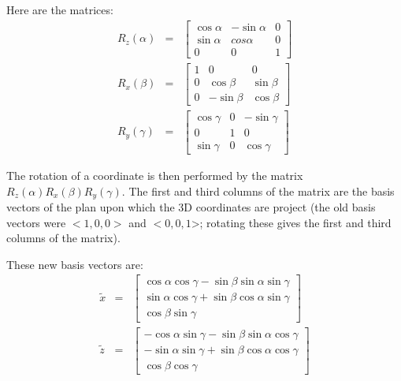 \documentclass[11pt,english,BCOR10mm,DIV12,bibliography=totoc,parskip=false,smallheadings
    headexclude,footexclude,oneside,dvipsnames,svgnames]{pst-doc}
\def\la{<}
\def\ra{>}
\begin{document}
 Here are the matrices:
 \begin{eqnarray*}
   R_z(\alpha) & = & \left[
     \begin{array}{ccc}
       \cos \alpha & -\sin \alpha & 0 \\
       \sin \alpha & cos \alpha   & 0 \\
       0           & 0            & 1
     \end{array} \right] \\
   R_x(\beta) & = & \left[
     \begin{array}{ccc}
       1           & 0            & 0 \\
       0           & \cos \beta   & \sin \beta \\
       0           & -\sin \beta  & \cos \beta
     \end{array} \right] \\
   R_y(\gamma) & = & \left[
     \begin{array}{ccc}
       \cos \gamma & 0            & -\sin \gamma \\
       0           & 1            & 0 \\
       \sin \gamma & 0            & \cos \gamma
     \end{array} \right]
 \end{eqnarray*}

 The rotation of a coordinate is then performed by the matrix $R_z(\alpha)
 R_x(\beta) R_y(\gamma)$. The first and third columns of the matrix are the
 basis vectors of the plan upon which the 3D coordinates are project (the old
 basis vectors were $\la 1, 0, 0\ra$ and $\la 0, 0, 1$\ra; rotating these
 gives the first and third columns of the matrix).

 These new basis vectors are:
 \begin{eqnarray*}
   \tilde{x} & = & \left[
     \begin{array}{c}
       \cos\alpha \cos\gamma - \sin\beta \sin\alpha \sin\gamma \\
       \sin\alpha \cos\gamma + \sin\beta \cos\alpha \sin\gamma \\
       \cos\beta \sin\gamma
     \end{array} \right] \\
   \tilde{z} & = & \left[
     \begin{array}{c}
       -\cos\alpha \sin\gamma - \sin\beta \sin\alpha \cos\gamma \\
       -\sin\alpha \sin\gamma + \sin\beta \cos\alpha \cos\gamma \\
       \cos\beta \cos\gamma
     \end{array} \right]
 \end{eqnarray*}
\end{document}
